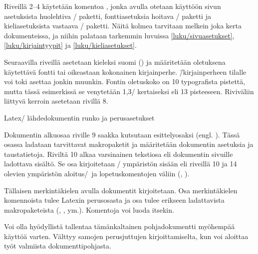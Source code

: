 Riveillä 2--4 käytetään komentoa , jonka avulla
otetaan käyttöön sivun asetuksista huolehtiva \-/
paketti, fonttiasetuksia hoitava \-/ paketti ja
kieliasetuksista vastaava \-/ paketti. Näitä kolmea
tarvitaan melkein joka kerta dokumenteissa, ja niihin palataan tarkemmin
luvuissa \ref{luku/sivuasetukset}, \ref{luku/kirjaintyypit} ja
\ref{luku/kieliasetukset}.

Seuraavilla riveillä asetetaan kieleksi suomi () ja
määritetään oletuksena käytettävä fontti tai oikeastaan kokonainen
kirjainperhe.  \=/kirjainperheen tilalle
voi toki asettaa jonkin muunkin. Fontin oletuskoko on 10 typografista
pistettä, mutta tässä esimerkissä se venytetään 1,3\-/ kertaiseksi eli
13 pisteeseen. Riviväliin liittyvä kerroin asetetaan rivillä 8.

\begin{esimerkki*}

  \caption{Latex\-/ lähdedokumentin runko ja perusasetukset}
  \label{esim/ensimmainen}
\end{esimerkki*}

Dokumentin alkuosaa riville 9 saakka kutsutaan esittelyosaksi (engl.
). Tässä osassa ladataan tarvittavat makropaketit ja
määritetään dokumentin asetuksia ja taustatietoja. Riviltä 10 alkaa
varsinainen tekstiosa eli dokumentin sivuille ladottava sisältö. Se osa
kirjoitetaan \-/ ympäristön sisään eli riveillä 10
ja 14 olevien ympäristön aloitus\-/\ ja lopetuskomentojen väliin
(, ).

Tällaisen merkintäkielen avulla dokumentit kirjoitetaan. Osa
merkintäkielen komennoista tulee Latexin perusosasta ja osa tulee
erikseen ladattavista makropaketeista (,
,  ym.). Komentoja voi luoda
itsekin.

Voi olla hyödyllistä tallentaa tämänkaltainen pohjadokumentti myöhempää
käyttöä varten. Välttyy samojen perusjuttujen kirjoittamiselta, kun voi
aloittaa työt valmiista dokumenttipohjasta.
